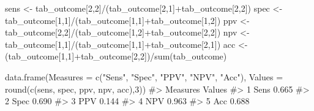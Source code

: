\documentclass[
  letterpaper,
]{krantz}
\makeatletter
\newenvironment{Shaded}{\begin{snugshade}}{\end{snugshade}}
\newcommand{\AttributeTok}[1]{\textcolor[rgb]{0.40,0.45,0.13}{#1}}
\newcommand{\CommentTok}[1]{\textcolor[rgb]{0.37,0.37,0.37}{#1}}
\newcommand{\DecValTok}[1]{\textcolor[rgb]{0.68,0.00,0.00}{#1}}
\newcommand{\FunctionTok}[1]{\textcolor[rgb]{0.28,0.35,0.67}{#1}}
\newcommand{\NormalTok}[1]{\textcolor[rgb]{0.00,0.23,0.31}{#1}}
\newcommand{\OtherTok}[1]{\textcolor[rgb]{0.00,0.23,0.31}{#1}}
\newcommand{\SpecialCharTok}[1]{\textcolor[rgb]{0.37,0.37,0.37}{#1}}
\newcommand{\StringTok}[1]{\textcolor[rgb]{0.13,0.47,0.30}{#1}}
\newenvironment{kframe}{%
\medskip{}
\setlength{\fboxsep}{.8em}
 \def\at@end@of@kframe{}%
 \ifinner\ifhmode%
  \def\at@end@of@kframe{\end{minipage}}%
  \begin{minipage}{\columnwidth}%
 \fi\fi%
 \def\FrameCommand##1{\hskip\@totalleftmargin \hskip-\fboxsep
 \colorbox{shadecolor}{##1}\hskip-\fboxsep
     \hskip-\linewidth \hskip-\@totalleftmargin \hskip\columnwidth}%
 \MakeFramed {\advance\hsize-\width
   \@totalleftmargin\z@ \linewidth\hsize
   \@setminipage}}%
 {\par\unskip\endMakeFramed%
 \at@end@of@kframe}
\renewenvironment{Shaded}{\begin{kframe}}{\end{kframe}}
\makeatother
\begin{document}
\begin{Shaded}
\begin{Highlighting}[]
\NormalTok{sens }\OtherTok{\textless{}{-}}\NormalTok{ tab\_outcome[}\DecValTok{2}\NormalTok{,}\DecValTok{2}\NormalTok{]}\SpecialCharTok{/}\NormalTok{(tab\_outcome[}\DecValTok{2}\NormalTok{,}\DecValTok{1}\NormalTok{]}\SpecialCharTok{+}\NormalTok{tab\_outcome[}\DecValTok{2}\NormalTok{,}\DecValTok{2}\NormalTok{])}
\NormalTok{spec }\OtherTok{\textless{}{-}}\NormalTok{ tab\_outcome[}\DecValTok{1}\NormalTok{,}\DecValTok{1}\NormalTok{]}\SpecialCharTok{/}\NormalTok{(tab\_outcome[}\DecValTok{1}\NormalTok{,}\DecValTok{1}\NormalTok{]}\SpecialCharTok{+}\NormalTok{tab\_outcome[}\DecValTok{1}\NormalTok{,}\DecValTok{2}\NormalTok{])}
\NormalTok{ppv }\OtherTok{\textless{}{-}}\NormalTok{ tab\_outcome[}\DecValTok{2}\NormalTok{,}\DecValTok{2}\NormalTok{]}\SpecialCharTok{/}\NormalTok{(tab\_outcome[}\DecValTok{1}\NormalTok{,}\DecValTok{2}\NormalTok{]}\SpecialCharTok{+}\NormalTok{tab\_outcome[}\DecValTok{2}\NormalTok{,}\DecValTok{2}\NormalTok{])}
\NormalTok{npv }\OtherTok{\textless{}{-}}\NormalTok{ tab\_outcome[}\DecValTok{1}\NormalTok{,}\DecValTok{1}\NormalTok{]}\SpecialCharTok{/}\NormalTok{(tab\_outcome[}\DecValTok{1}\NormalTok{,}\DecValTok{1}\NormalTok{]}\SpecialCharTok{+}\NormalTok{tab\_outcome[}\DecValTok{2}\NormalTok{,}\DecValTok{1}\NormalTok{])}
\NormalTok{acc }\OtherTok{\textless{}{-}}\NormalTok{ (tab\_outcome[}\DecValTok{1}\NormalTok{,}\DecValTok{1}\NormalTok{]}\SpecialCharTok{+}\NormalTok{tab\_outcome[}\DecValTok{2}\NormalTok{,}\DecValTok{2}\NormalTok{])}\SpecialCharTok{/}\FunctionTok{sum}\NormalTok{(tab\_outcome)}
\end{Highlighting}
\end{Shaded}

\begin{Shaded}
\begin{Highlighting}[]
\FunctionTok{data.frame}\NormalTok{(}\AttributeTok{Measures =} \FunctionTok{c}\NormalTok{(}\StringTok{"Sens"}\NormalTok{, }\StringTok{"Spec"}\NormalTok{, }\StringTok{"PPV"}\NormalTok{, }\StringTok{"NPV"}\NormalTok{, }\StringTok{"Acc"}\NormalTok{),}
          \AttributeTok{Values =} \FunctionTok{round}\NormalTok{(}\FunctionTok{c}\NormalTok{(sens, spec, ppv, npv, acc),}\DecValTok{3}\NormalTok{))}
\CommentTok{\#\textgreater{}   Measures Values}
\CommentTok{\#\textgreater{} 1     Sens  0.665}
\CommentTok{\#\textgreater{} 2     Spec  0.690}
\CommentTok{\#\textgreater{} 3      PPV  0.144}
\CommentTok{\#\textgreater{} 4      NPV  0.963}
\CommentTok{\#\textgreater{} 5      Acc  0.688}
\end{Highlighting}
\end{Shaded}
\end{document}
